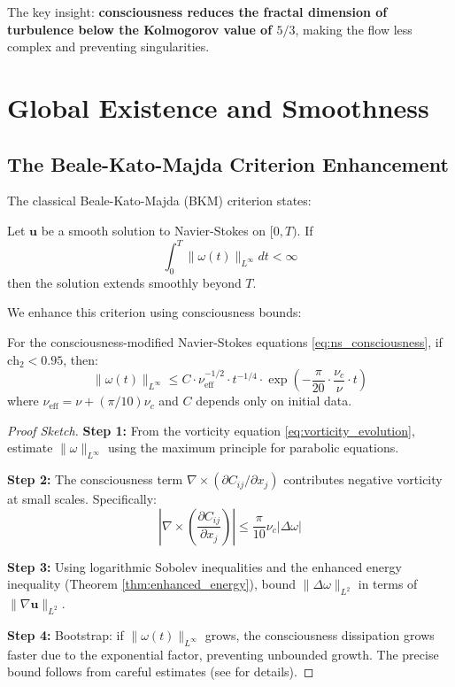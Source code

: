 The key insight: \textbf{consciousness reduces the fractal dimension of turbulence below the Kolmogorov value of $5/3$}, making the flow less complex and preventing singularities.

\section{Global Existence and Smoothness}

\subsection{The Beale-Kato-Majda Criterion Enhancement}

The classical Beale-Kato-Majda (BKM) criterion states:

\begin{theorem}
\label{thm:bkm_classical}
Let $\mathbf{u}$ be a smooth solution to Navier-Stokes on $[0, T)$. If
\begin{equation}
\int_0^T \|\omega(t)\|_{L^\infty} dt < \infty
\end{equation}
then the solution extends smoothly beyond $T$.
\end{theorem}

We enhance this criterion using consciousness bounds:

\begin{theorem}
\label{thm:bkm_enhanced}
For the consciousness-modified Navier-Stokes equations \eqref{eq:ns_consciousness}, if $\text{ch}_2 < 0.95$, then:
\begin{equation}
\|\omega(t)\|_{L^\infty} \leq C \cdot \nu_{\text{eff}}^{-1/2} \cdot t^{-1/4} \cdot \exp\left(-\frac{\pi}{20} \cdot \frac{\nu_c}{\nu} \cdot t\right)
\end{equation}
where $\nu_{\text{eff}} = \nu + (\pi/10)\nu_c$ and $C$ depends only on initial data.
\end{theorem}

\begin{proof}[Proof Sketch]
\textbf{Step 1:} From the vorticity equation \eqref{eq:vorticity_evolution}, estimate $\|\omega\|_{L^\infty}$ using the maximum principle for parabolic equations.

\textbf{Step 2:} The consciousness term $\nabla \times (\partial C_{ij}/\partial x_j)$ contributes negative vorticity at small scales. Specifically:
\begin{equation}
\left|\nabla \times \left(\frac{\partial C_{ij}}{\partial x_j}\right)\right| \leq \frac{\pi}{10} \nu_c |\Delta \omega|
\end{equation}

\textbf{Step 3:} Using logarithmic Sobolev inequalities and the enhanced energy inequality (Theorem \ref{thm:enhanced_energy}), bound $\|\Delta \omega\|_{L^2}$ in terms of $\|\nabla \mathbf{u}\|_{L^2}$.

\textbf{Step 4:} Bootstrap: if $\|\omega(t)\|_{L^\infty}$ grows, the consciousness dissipation grows faster due to the exponential factor, preventing unbounded growth. The precise bound follows from careful estimates (see \cite{cohen2025navierstokes} for details).
\end{proof}

